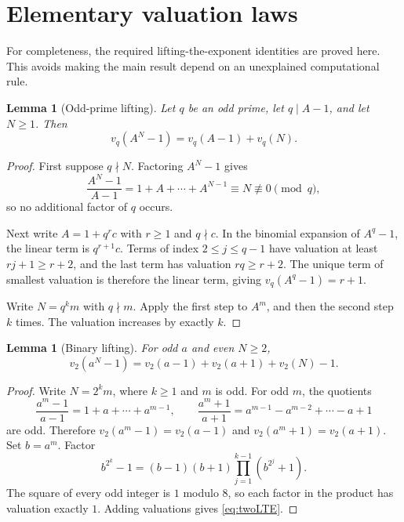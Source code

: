 \documentclass[11pt,letterpaper]{article}
\numberwithin{equation}{section}
\newtheorem{lemma}[theorem]{Lemma}
\theoremstyle{definition}
\theoremstyle{remark}
\begin{document}
\section{Elementary valuation laws}\label{sec:local}

For completeness, the required lifting-the-exponent identities are proved here. This avoids making the main result depend on an unexplained computational rule.

\begin{lemma}[Odd-prime lifting]\label{lem:oddLTE}
Let $q$ be an odd prime, let $q\mid A-1$, and let $N\ge1$. Then
\[
 v_q(A^N-1)=v_q(A-1)+v_q(N).
\]
\end{lemma}
\begin{proof}
First suppose $q\nmid N$. Factoring $A^N-1$ gives
\[
 \frac{A^N-1}{A-1}=1+A+\cdots+A^{N-1}\equiv N\not\equiv0\pmod q,
\]
so no additional factor of $q$ occurs.

Next write $A=1+q^r c$ with $r\ge1$ and $q\nmid c$. In the binomial expansion of $A^q-1$, the linear term is $q^{r+1}c$. Terms of index $2\le j\le q-1$ have valuation at least $rj+1\ge r+2$, and the last term has valuation $rq\ge r+2$. The unique term of smallest valuation is therefore the linear term, giving $v_q(A^q-1)=r+1$.

Write $N=q^k m$ with $q\nmid m$. Apply the first step to $A^m$, and then the second step $k$ times. The valuation increases by exactly $k$.
\end{proof}

\begin{lemma}[Binary lifting]\label{lem:twoLTE}
For odd $a$ and even $N\ge2$,
\begin{equation}\label{eq:twoLTE}
 v_2(a^N-1)=v_2(a-1)+v_2(a+1)+v_2(N)-1.
\end{equation}
\end{lemma}
\begin{proof}
Write $N=2^k m$, where $k\ge1$ and $m$ is odd. For odd $m$, the quotients
\[
 \frac{a^m-1}{a-1}=1+a+\cdots+a^{m-1},\qquad
 \frac{a^m+1}{a+1}=a^{m-1}-a^{m-2}+\cdots-a+1
\]
are odd. Therefore $v_2(a^m-1)=v_2(a-1)$ and $v_2(a^m+1)=v_2(a+1)$. Set $b=a^m$. Factor
\[
 b^{2^k}-1=(b-1)(b+1)\prod_{j=1}^{k-1}(b^{2^j}+1).
\]
The square of every odd integer is $1$ modulo $8$, so each factor in the product has valuation exactly $1$. Adding valuations gives \eqref{eq:twoLTE}.
\end{proof}
\end{document}
